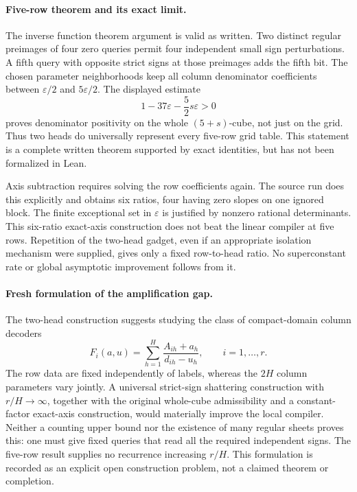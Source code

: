\documentclass[11pt]{article}
\begin{document}
\paragraph{Five-row theorem and its exact limit.}
The inverse function theorem argument is valid as written. Two distinct
regular preimages of four zero queries permit four independent small
sign perturbations. A fifth query with opposite strict signs at those
preimages adds the fifth bit. The chosen parameter neighborhoods keep
all column denominator coefficients between $\varepsilon/2$ and
$5\varepsilon/2$. The displayed estimate
\[
 1-37\varepsilon-\frac52s\varepsilon>0
\]
proves denominator positivity on the whole $(5+s)$-cube, not just on
the grid. Thus two heads do universally represent every five-row grid
table. This statement is a complete written theorem supported by exact
identities, but has not been formalized in Lean.

Axis subtraction requires solving the row coefficients again. The
source run does this explicitly and obtains six ratios, four having
zero slopes on one ignored block. The finite exceptional set in
$\varepsilon$ is justified by nonzero rational determinants. This
six-ratio exact-axis construction does not beat the linear compiler
at five rows. Repetition of the two-head gadget, even if an appropriate
isolation mechanism were supplied, gives only a fixed row-to-head ratio.
No superconstant rate or global asymptotic improvement follows from it.

\paragraph{Fresh formulation of the amplification gap.}
The two-head construction suggests studying the class of compact-domain
column decoders
\[
 F_i(a,u)=\sum_{h=1}^H\frac{A_{ih}+a_h}{d_{ih}-u_h},
 \qquad i=1,\ldots,r.
\]
The row data are fixed independently of labels, whereas the $2H$ column
parameters vary jointly. A universal strict-sign shattering construction
with $r/H\to\infty$, together with the original whole-cube admissibility
and a constant-factor exact-axis construction, would materially improve
the local compiler. Neither a counting upper bound nor the existence of
many regular sheets proves this: one must give fixed queries that read
all the required independent signs. The five-row result supplies no
recurrence increasing $r/H$. This formulation is recorded as an explicit
open construction problem, not a claimed theorem or completion.
\end{document}
